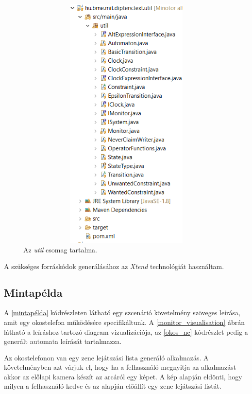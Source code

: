 \begin{figure}[!ht]
    \centering
    \includegraphics[width=180mm, height= 13cm, keepaspectratio]{figures/util_csomag.png}
    \caption{Az \textit{util} csomag tartalma.}
	\label{util_csomag}
\end{figure}

A szükséges forráskódok generálásához az \textit{Xtend} technológiát használtam.

\clearpage\subsection{Mintapélda}

A \ref{mintapélda} kódrészleten látható egy szcenárió követelmény szöveges leírása, amit egy okostelefon működésére specifikáltunk.
A \ref{monitor_visualisation} ábrán látható a leíráshoz tartozó diagram vizualizációja, az \ref{okos_nc} kódrészlet pedig a generált automata leírását tartalmazza.

Az okostelefonon van egy zene lejátszási lista generáló alkalmazás.
A követelményben azt várjuk el, hogy ha a felhasználó megnyitja az alkalmazást akkor az előlapi kamera készít az arcáról egy képet.
A kép alapján eldönti, hogy milyen a felhasználó kedve és az alapján előállít egy zene lejátszási listát.

